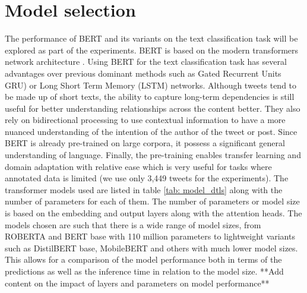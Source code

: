 \section{Model selection}
The performance of BERT and its variants on the text classification task will be explored as part of the experiments. BERT \cite{devlinBERTPretrainingDeep2018} is based on the modern transformers network architecture \cite{vaswaniAttentionAllYou2023a}. Using BERT for the text classification task has several advantages over previous dominant methods such as Gated Recurrent Units GRU) \cite{chungEmpiricalEvaluationGated2014} or Long Short Term Memory (LSTM) \cite{hochreiterLongShortTermMemory1997} networks. Although tweets tend to be made up of short texts, the ability to capture long-term dependencies is still useful for better understanding relationships across the content better. They also rely on bidirectional processing to use contextual information to have a more nuanced understanding of the intention of the author of the tweet or post. Since BERT is already pre-trained on large corpora, it possess a significant general understanding of language. Finally, the pre-training enables transfer learning and domain adaptation with relative ease which is very useful for tasks where annotated data is limited (we use only 3,449 tweets for the experiments).
\newline\newline
The transformer models used are listed in table \ref{tab: model_dtls} along with the number of parameters for each of them. The number of parameters or model size is based on the embedding and output layers along with the attention heads. The models chosen are such that there is a wide range of model sizes, from ROBERTA and BERT base with 110 million parameters to lightweight variants such as DistilBERT base, MobileBERT and others with much lower model sizes. This allows for a comparison of the model performance both in terms of the predictions as well as the inference time in relation to the model size. **Add content on the impact of layers and parameters on model performance**

